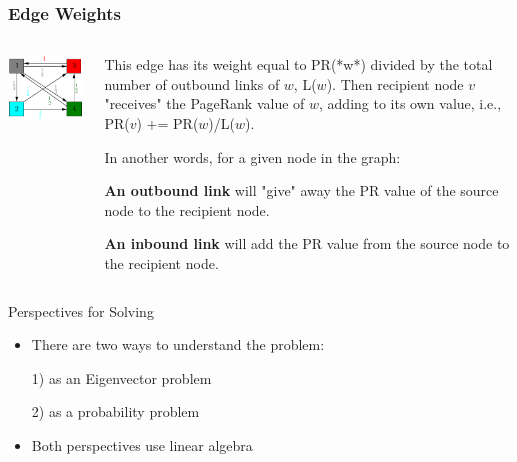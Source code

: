 \documentclass{beamer}
\begin{document}
\begin{frame}
\frametitle{Edge Weights}
\begin{columns}
    \begin{column}{0.5\textwidth}
        \includegraphics[width=\textwidth]{weighted.png}
    \end{column}
    \begin{column}{0.5\textwidth}
        This edge has its weight equal to PR(*w*) divided by the total number of outbound links of $w$, L($w$). Then recipient node $v$ "receives" the PageRank value of $w$, adding to its own value, i.e., PR($v$) += PR($w$)/L($w$). 
        
        In another words, for a given node in the graph:

        \textbf{An outbound link} will "give" away the PR value of the source node to the recipient node.  

        \textbf{An inbound link} will add the PR value from the source node to the recipient node.
    \end{column}
\end{columns}
\end{frame}

\begin{frame}[t]{Perspectives for Solving}
    \begin{itemize}
        \setlength\itemsep{1em}
        \item There are two ways to understand the problem:
        \item[1)] as an Eigenvector problem
        \item[2)] as a probability problem
        \item Both perspectives use linear algebra 
    \end{itemize}
\end{frame}
\end{document}
